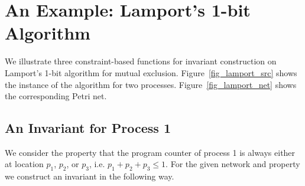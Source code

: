 \section{An Example: Lamport's 1-bit Algorithm}

We illustrate three constraint-based functions for
invariant construction on Lamport's 1-bit algorithm for mutual
exclusion\cite{LamportJACM86}.
Figure~\ref{fig_lamport_src} shows the instance of the algorithm 
for two processes. Figure~\ref{fig_lamport_net} 
shows the corresponding Petri net.



\subsection{An Invariant for Process 1}

We consider the property that the program counter of process 1 is
always either at location $p_1$, $p_2$, or $p_3$, i.e. $p_1 + p_2 +
p_3 \leq 1$. For the given network and property we construct an
invariant in the following way.


